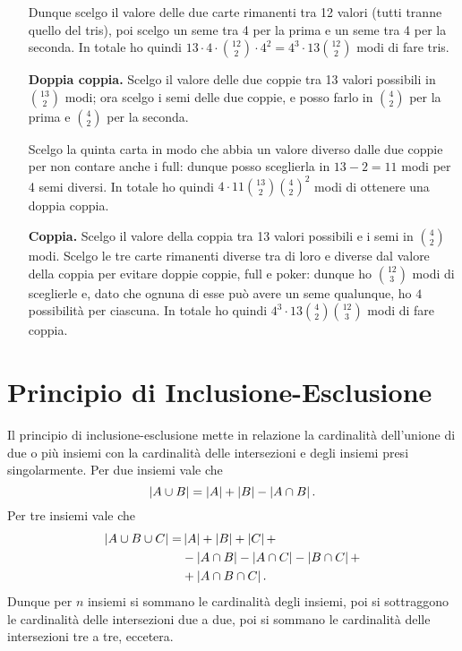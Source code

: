 \begin{itemize}
    Dunque scelgo il valore delle due carte rimanenti tra 12 valori (tutti tranne quello del tris), poi scelgo un seme tra 4 per la prima e un seme tra 4 per la seconda. In totale ho quindi $13 \cdot 4 \cdot \binom{12}{2} \cdot 4^2 = 4^3 \cdot 13 \binom{12}{2}$ modi di fare tris.
    \item[\textbf{Doppia coppia.}] Scelgo il valore delle due coppie tra 13 valori possibili in $\binom{13}{2}$ modi; ora scelgo i semi delle due coppie, e posso farlo in $\binom{4}{2}$ per la prima e $\binom{4}{2}$ per la seconda. 
    
    Scelgo la quinta carta in modo che abbia un valore diverso dalle due coppie per non contare anche i full: dunque posso sceglierla in $13 - 2 = 11$ modi per 4 semi diversi. In totale ho quindi $4 \cdot 11\binom{13}{2}\binom{4}{2}^2$ modi di ottenere una doppia coppia.
    \item[\textbf{Coppia.}] Scelgo il valore della coppia tra 13 valori possibili e i semi in $\binom{4}{2}$ modi. Scelgo le tre carte rimanenti diverse tra di loro e diverse dal valore della coppia per evitare doppie coppie, full e poker: dunque ho $\binom{12}{3}$ modi di sceglierle e, dato che ognuna di esse può avere un seme qualunque, ho $4$ possibilità per ciascuna. In totale ho quindi $4^3 \cdot 13 \binom{4}{2} \binom{12}{3}$ modi di fare coppia.
\end{itemize}

\section{Principio di Inclusione-Esclusione}

Il principio di inclusione-esclusione mette in relazione la cardinalità dell'unione di due o più insiemi con la cardinalità delle intersezioni e degli insiemi presi singolarmente. Per due insiemi vale che \begin{equation}
    \left|A \cup B\right| = \left|A\right| + \left|B\right| - \left|A \cap B\right|.
\end{equation}
Per tre insiemi vale che \begin{alignat*}{1}
    \left|A \cup B \cup C\right| = 
        &\left|A\right| + \left|B\right| + \left|C\right| +\\
        &- \left|A \cap B\right| - \left|A \cap C\right| - \left|B \cap C\right| +\\
        &+ \left|A \cap B \cap C\right|.
\end{alignat*}
Dunque per $n$ insiemi si sommano le cardinalità degli insiemi, poi si sottraggono le cardinalità delle intersezioni due a due, poi si sommano le cardinalità delle intersezioni tre a tre, eccetera.

